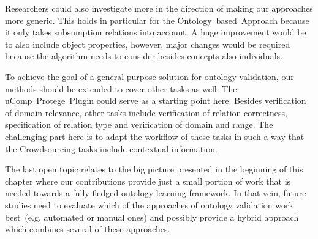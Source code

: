 Researchers could also investigate more in the direction of making our approaches more generic. This holds in particular for the Ontology~based~Approach because it only takes subsumption relations into account. A huge improvement would be to also include object properties, however, major changes would be required because the algorithm needs to consider besides concepts also individuals. 

To achieve the goal of a general purpose solution for ontology validation, our methods should be extended to cover other tasks as well.
The \hyperref[sec:ucomp_protege_plugin]{uComp~Protege~Plugin} could serve as a starting point here. Besides verification of domain relevance, other tasks include verification of relation correctness, specification of relation type and verification of domain and range. The challenging part here is to adapt the workflow of these tasks in such a way that the Crowdsourcing tasks include contextual information. 

The last open topic relates to the big picture presented in the beginning of this chapter where our contributions provide just a small portion of work that is needed towards a fully fledged ontology learning framework. In that vein, future studies need to evaluate which of the approaches of ontology validation work best~(e.g. automated or manual ones) and possibly provide a hybrid approach which combines several of these approaches.



